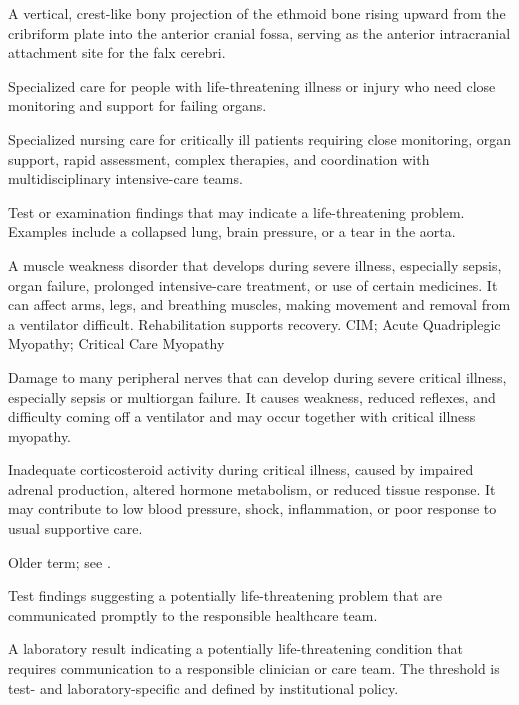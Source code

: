  A vertical, crest-like bony projection of the ethmoid bone rising upward from the cribriform plate into the anterior cranial fossa, serving as the anterior intracranial attachment site for the falx cerebri.

 Specialized care for people with life-threatening illness or injury who need close monitoring and support for failing organs.

 Specialized nursing care for critically ill patients requiring close monitoring, organ support, rapid assessment, complex therapies, and coordination with multidisciplinary intensive-care teams.

 Test or examination findings that may indicate a life-threatening problem. Examples include a collapsed lung, brain pressure, or a tear in the aorta.

 A muscle weakness disorder that develops during severe illness, especially sepsis, organ failure, prolonged intensive-care treatment, or use of certain medicines. It can affect arms, legs, and breathing muscles, making movement and removal from a ventilator difficult. Rehabilitation supports recovery.
\synonyms
CIM; Acute Quadriplegic Myopathy; Critical Care Myopathy

 Damage to many peripheral nerves that can develop during severe critical illness, especially sepsis or multiorgan failure. It causes weakness, reduced reflexes, and difficulty coming off a ventilator and may occur together with critical illness myopathy.

 Inadequate corticosteroid activity during critical illness, caused by impaired adrenal production, altered hormone metabolism, or reduced tissue response. It may contribute to low blood pressure, shock, inflammation, or poor response to usual supportive care.

 Older term; see .

 Test findings suggesting a potentially life-threatening problem that are communicated promptly to the responsible healthcare team.

 A laboratory result indicating a potentially life-threatening condition that requires
communication to a responsible clinician or care team. The threshold is test- and
laboratory-specific and defined by institutional policy.

